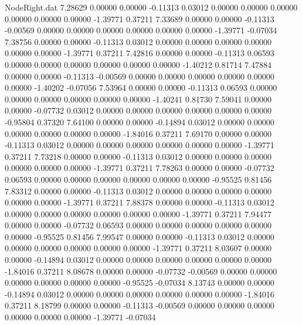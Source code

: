 \begin{filecontents}{NodeRight.dat}
   7.28629    0.00000    0.00000    -0.11313    0.03012    0.00000    0.00000    0.00000    0.00000    0.00000    0.00000   -1.39771    0.37211
   7.33689    0.00000    0.00000    -0.11313   -0.00569    0.00000    0.00000    0.00000    0.00000    0.00000    0.00000   -1.39771   -0.07034
   7.38756    0.00000    0.00000    -0.11313    0.03012    0.00000    0.00000    0.00000    0.00000    0.00000    0.00000   -1.39771    0.37211
   7.42816    0.00000    0.00000    -0.11313    0.06593    0.00000    0.00000    0.00000    0.00000    0.00000    0.00000   -1.40212    0.81714
   7.47884    0.00000    0.00000    -0.11313   -0.00569    0.00000    0.00000    0.00000    0.00000    0.00000    0.00000   -1.40202   -0.07056
   7.53964    0.00000    0.00000    -0.11313    0.06593    0.00000    0.00000    0.00000    0.00000    0.00000    0.00000   -1.40241    0.81730
   7.59041    0.00000    0.00000    -0.07732    0.03012    0.00000    0.00000    0.00000    0.00000    0.00000    0.00000   -0.95804    0.37320
   7.64100    0.00000    0.00000    -0.14894    0.03012    0.00000    0.00000    0.00000    0.00000    0.00000    0.00000   -1.84016    0.37211
   7.69170    0.00000    0.00000    -0.11313    0.03012    0.00000    0.00000    0.00000    0.00000    0.00000    0.00000   -1.39771    0.37211
   7.73218    0.00000    0.00000    -0.11313    0.03012    0.00000    0.00000    0.00000    0.00000    0.00000    0.00000   -1.39771    0.37211
   7.78263    0.00000    0.00000    -0.07732    0.06593    0.00000    0.00000    0.00000    0.00000    0.00000    0.00000   -0.95525    0.81456
   7.83312    0.00000    0.00000    -0.11313    0.03012    0.00000    0.00000    0.00000    0.00000    0.00000    0.00000   -1.39771    0.37211
   7.88378    0.00000    0.00000    -0.11313    0.03012    0.00000    0.00000    0.00000    0.00000    0.00000    0.00000   -1.39771    0.37211
   7.94477    0.00000    0.00000    -0.07732    0.06593    0.00000    0.00000    0.00000    0.00000    0.00000    0.00000   -0.95525    0.81456
   7.99547    0.00000    0.00000    -0.11313    0.03012    0.00000    0.00000    0.00000    0.00000    0.00000    0.00000   -1.39771    0.37211
   8.03607    0.00000    0.00000    -0.14894    0.03012    0.00000    0.00000    0.00000    0.00000    0.00000    0.00000   -1.84016    0.37211
   8.08678    0.00000    0.00000    -0.07732   -0.00569    0.00000    0.00000    0.00000    0.00000    0.00000    0.00000   -0.95525   -0.07034
   8.13743    0.00000    0.00000    -0.14894    0.03012    0.00000    0.00000    0.00000    0.00000    0.00000    0.00000   -1.84016    0.37211
   8.18799    0.00000    0.00000    -0.11313   -0.00569    0.00000    0.00000    0.00000    0.00000    0.00000    0.00000   -1.39771   -0.07034

\end{filecontents}
